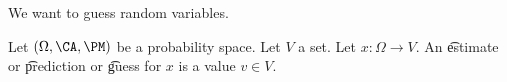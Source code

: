 

We want to guess random variables.


Let $(\Omega, \CA, \PM)$ be a probability space.
Let $V$ a set.
Let $x: \Omega \to V$.
An \t{estimate} or \t{prediction} or \t{guess} for $x$ is a value $v \in V$.

\blankpage
